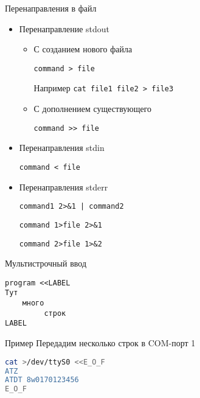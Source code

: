\documentclass[ignorenonframetext, professionalfonts, hyperref={unicode}]{beamer}
\begin{document}
\begin{frame}{Перенаправления в файл}

\begin{itemize}
  \item Перенаправление stdout 
    \begin{itemize}
      \item С созданием нового файла

        {\tt command > file}

        Например {\tt cat file1 file2 > file3}
      \item С дополнением существующего

        {\tt command >\phantom{}> file}
    \end{itemize}
    \pause
  \item Перенаправления stdin

    {\tt command < file}
    \pause
  \item Перенаправления stderr

    {\tt command1 2>\&1 | command2}

   {\tt command 1>file 2>\&1}

   {\tt command 2>file 1>\&2}
\end{itemize}

\end{frame}

\begin{frame}[fragile]{Мультистрочный ввод}

\begin{verbatim}
program <<LABEL
Тут
    много
	     строк
LABEL
\end{verbatim}

	\pause
	\begin{block}{Пример}
	Передадим несколько строк в COM-порт 1
\begin{lstlisting}[language=bash]
cat >/dev/ttyS0 <<E_O_F
ATZ
ATDT 8w0170123456
E_O_F
\end{lstlisting}
	\end{block}
\end{frame}
\end{document}
